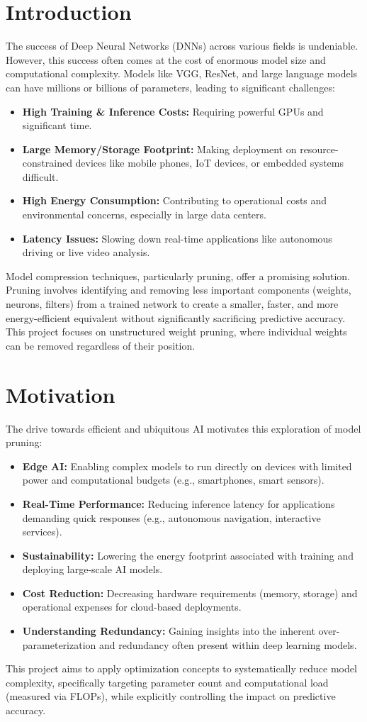 \documentclass[10pt, article]{article} %
\begin{document}
\section{Introduction}
The success of Deep Neural Networks (DNNs) across various fields is undeniable. However, this success often comes at the cost of enormous model size and computational complexity. Models like VGG, ResNet, and large language models can have millions or billions of parameters, leading to significant challenges:
\begin{itemize}
    \item \textbf{High Training \& Inference Costs:} Requiring powerful GPUs and significant time.
    \item \textbf{Large Memory/Storage Footprint:} Making deployment on resource-constrained devices like mobile phones, IoT devices, or embedded systems difficult.
    \item \textbf{High Energy Consumption:} Contributing to operational costs and environmental concerns, especially in large data centers.
    \item \textbf{Latency Issues:} Slowing down real-time applications like autonomous driving or live video analysis.
\end{itemize}
Model compression techniques, particularly pruning, offer a promising solution. Pruning involves identifying and removing less important components (weights, neurons, filters) from a trained network to create a smaller, faster, and more energy-efficient equivalent without significantly sacrificing predictive accuracy. This project focuses on unstructured weight pruning, where individual weights can be removed regardless of their position.

\section{Motivation}
The drive towards efficient and ubiquitous AI motivates this exploration of model pruning:
\begin{itemize}
    \item \textbf{Edge AI:} Enabling complex models to run directly on devices with limited power and computational budgets (e.g., smartphones, smart sensors).
    \item \textbf{Real-Time Performance:} Reducing inference latency for applications demanding quick responses (e.g., autonomous navigation, interactive services).
    \item \textbf{Sustainability:} Lowering the energy footprint associated with training and deploying large-scale AI models.
    \item \textbf{Cost Reduction:} Decreasing hardware requirements (memory, storage) and operational expenses for cloud-based deployments.
    \item \textbf{Understanding Redundancy:} Gaining insights into the inherent over-parameterization and redundancy often present within deep learning models.
\end{itemize}
This project aims to apply optimization concepts to systematically reduce model complexity, specifically targeting parameter count and computational load (measured via FLOPs), while explicitly controlling the impact on predictive accuracy.
\end{document}
